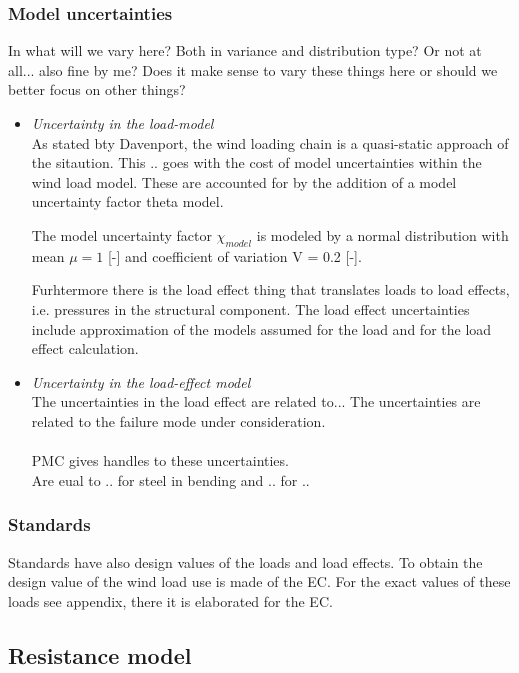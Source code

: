 \subsubsection{Model uncertainties}
\begin{framed}
In what will we vary here? Both in variance and distribution type? Or not at all... also fine by me? Does it make sense to vary these things here or should we better focus on other things?
\end{framed}
\begin{itemize}
\item \textit{Uncertainty in the load-model}\\
As stated bty Davenport, the wind loading chain is a quasi-static approach of the sitaution. This .. goes with the cost of model uncertainties within the wind load model. These are accounted for by the addition of a model uncertainty factor theta model.

The model uncertainty factor $\chi_{model}$ is modeled by a normal distribution with mean $\mu=1$ [-] and coefficient of variation  V = 0.2 [-]. 

Furhtermore there is the load effect thing that translates loads to load effects, i.e. pressures in the structural component. 
The load effect uncertainties include approximation of the models assumed for the load and for the load effect calculation. 



\item \textit{Uncertainty in the load-effect model}\\
The uncertainties in the load effect are related to... The uncertainties are related to the failure mode under consideration.\\
\\
PMC gives handles to these uncertainties. \\
Are eual to .. for steel in bending and .. for .. 

\end{itemize}


\subsubsection{Standards}
Standards have also design values of the loads and load effects. To obtain the design value of the wind load use is made of the EC. For the exact values of these loads see appendix, there it is elaborated for the EC. 

\subsection{Resistance model}


